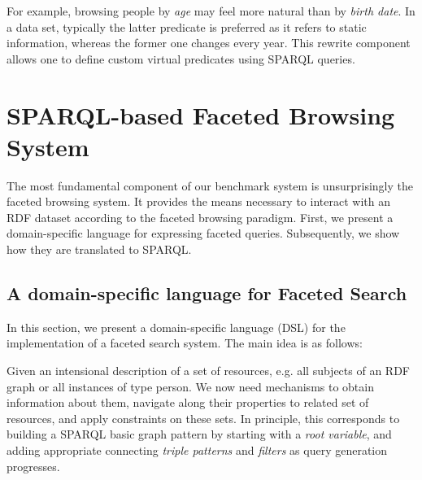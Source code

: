 \begin{itemize}
  For example, browsing people by \emph{age} may feel more natural than by \emph{birth date}. In a data set, typically the latter predicate is preferred as it refers to static information, whereas the former one changes every year. This rewrite component allows one to define custom virtual predicates using SPARQL queries.
\end{itemize}


\section{SPARQL-based Faceted Browsing System}
\label{sec:engine}
The most fundamental component of our benchmark system is unsurprisingly the faceted browsing system.
It provides the means necessary to interact with an RDF dataset according to the faceted browsing paradigm.
First, we present a domain-specific language for expressing faceted queries. Subsequently, we show how they are translated to SPARQL.

\subsection{A domain-specific language for Faceted Search}
In this section, we present a domain-specific language (DSL) for the implementation of a faceted search system.
The main idea is as follows:

Given an intensional description of a set of resources, e.g. all subjects of an RDF graph or all instances of type person. We now need mechanisms to obtain information about them, navigate along their properties to related set of resources, and apply constraints on these sets. In principle, this corresponds to building a SPARQL basic graph pattern by starting with a \emph{root variable}, and adding appropriate connecting \emph{triple patterns} and \emph{filters} as query generation progresses.

